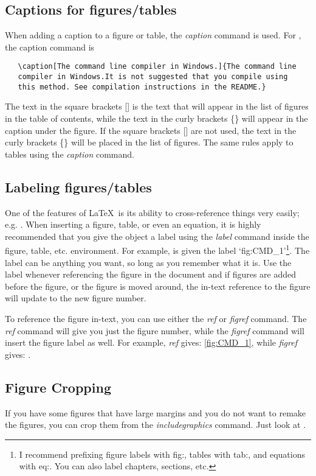 \subsection{Captions for figures/tables}
When adding a caption to a figure or table, the {\it caption} command is used. For , the caption command is
\begin{verbatim}
   \caption[The command line compiler in Windows.]{The command line
   compiler in Windows.It is not suggested that you compile using
   this method. See compilation instructions in the README.}
\end{verbatim}
The text in the square brackets [] is the text that will appear in the list of figures in the table of contents, while the text in the curly brackets \{\} will appear in the caption under the figure. If the square brackets [] are not used, the text in the curly brackets \{\} will be placed in the list of figures. The same rules apply to tables using the {\it caption} command.

\subsection{Labeling figures/tables}
One of the features of \LaTeX\ is its ability to cross-reference things very easily; e.g. . When inserting a figure, table, or even an equation, it is highly recommended that you give the object a label using the {\it label} command inside the figure, table, etc. environment. For example,  is given the label `fig:CMD\_1'\footnote{I recommend prefixing figure labels with fig:, tables with tab:, and equations with eq:. You can also label chapters, sections, etc.}. The label can be anything you want, so long as you remember what it is. Use the label whenever referencing the figure in the document and if figures are added before the figure, or the figure is moved around, the in-text reference to the figure will update to the new figure number.

To reference the figure in-text, you can use either the {\it ref} or {\it figref} command. The {\it ref} command will give you just the figure number, while the {\it figref} command will insert the figure label as well. For example, {\it ref} gives: \ref{fig:CMD_1}, while {\it figref} gives: .

\subsection{Figure Cropping}
If you have some figures that have large margins and you do not want to remake the figures, you can crop them from the {\it includegraphics} command. Just look at . 

